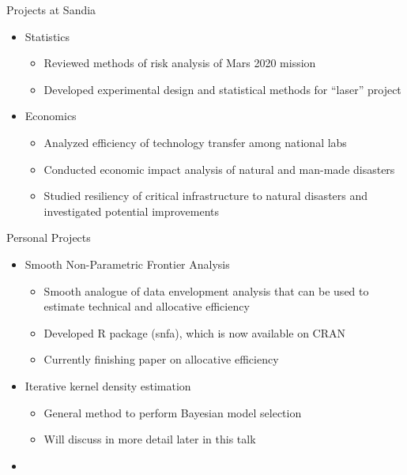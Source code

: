 \documentclass{beamer}
\begin{document}
\begin{frame}{Projects at Sandia}
\begin{itemize}
	\item Statistics
		\begin{itemize}
			\item Reviewed methods of risk analysis of Mars 2020 mission
			\item Developed experimental design and statistical methods for ``laser'' project
		\end{itemize}
	\item Economics
		\begin{itemize}
			\item Analyzed efficiency of technology transfer among national labs
			\item Conducted economic impact analysis of natural and man-made disasters
			\item Studied resiliency of critical infrastructure to natural disasters and investigated potential improvements
		\end{itemize}
\end{itemize}
\end{frame}

\begin{frame}{Personal Projects}
\begin{itemize}
	\item Smooth Non-Parametric Frontier Analysis
		\begin{itemize}
			\item Smooth analogue of data envelopment analysis that can be used to estimate technical and allocative efficiency
			\item Developed R package (snfa), which is now available on CRAN
			\item Currently finishing paper on allocative efficiency
		\end{itemize}
	\item Iterative kernel density estimation
		\begin{itemize}
			\item General method to perform Bayesian model selection
			\item Will discuss in more detail later in this talk
		\end{itemize}
\end{itemize}
\end{frame}

\begin{frame}
\begin{itemize}
	\item 
\end{itemize}
\end{frame}
\end{document}
